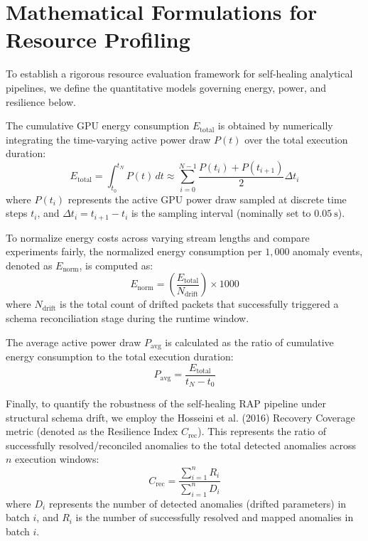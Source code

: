 
\section{Mathematical Formulations for Resource Profiling}
\label{sec:math_formulations}

To establish a rigorous resource evaluation framework for self-healing analytical pipelines, we define the quantitative models governing energy, power, and resilience below.

The cumulative GPU energy consumption $E_{\text{total}}$ is obtained by numerically integrating the time-varying active power draw $P(t)$ over the total execution duration:
\begin{equation}
E_{\text{total}} = \int_{t_0}^{t_N} P(t) \, dt \approx \sum_{i=0}^{N-1} \frac{P(t_i) + P(t_{i+1})}{2} \Delta t_i
\end{equation}
where $P(t_i)$ represents the active GPU power draw sampled at discrete time steps $t_i$, and $\Delta t_i = t_{i+1} - t_i$ is the sampling interval (nominally set to $\qty{0.05}{\second}$).

To normalize energy costs across varying stream lengths and compare experiments fairly, the normalized energy consumption per $1,000$ anomaly events, denoted as $E_{\text{norm}}$, is computed as:
\begin{equation}
E_{\text{norm}} = \left( \frac{E_{\text{total}}}{N_{\text{drift}}} \right) \times 1000
\end{equation}
where $N_{\text{drift}}$ is the total count of drifted packets that successfully triggered a schema reconciliation stage during the runtime window.

The average active power draw $P_{\text{avg}}$ is calculated as the ratio of cumulative energy consumption to the total execution duration:
\begin{equation}
P_{\text{avg}} = \frac{E_{\text{total}}}{t_N - t_0}
\end{equation}

Finally, to quantify the robustness of the self-healing RAP pipeline under structural schema drift, we employ the Hosseini et al. (2016) Recovery Coverage metric (denoted as the Resilience Index $C_{\text{rec}}$). This represents the ratio of successfully resolved/reconciled anomalies to the total detected anomalies across $n$ execution windows:
\begin{equation}
C_{\text{rec}} = \frac{\sum_{i=1}^{n} R_i}{\sum_{i=1}^{n} D_i}
\end{equation}
where $D_i$ represents the number of detected anomalies (drifted parameters) in batch $i$, and $R_i$ is the number of successfully resolved and mapped anomalies in batch $i$.
